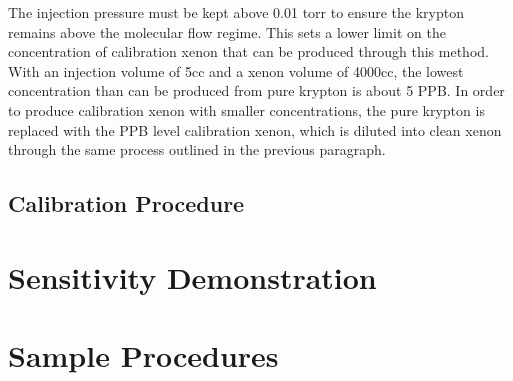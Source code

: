 \documentclass[12pt]{article}
\begin{document}
The injection pressure must be kept above 0.01 torr to ensure the krypton remains above the molecular flow regime. This sets a lower limit on the concentration of calibration xenon that can be produced through this method. With an injection volume of 5cc and a xenon volume of 4000cc, the lowest concentration than can be produced from pure krypton is about 5 PPB. In order to produce calibration xenon with smaller concentrations, the pure krypton is replaced with the PPB level calibration xenon, which is diluted into clean xenon through the same process outlined in the previous paragraph.

\subsection{Calibration Procedure}


\section{Sensitivity Demonstration}




\appendix
\section{Sample Procedures}
\label{ap:procedures}



{}

\end{document}
